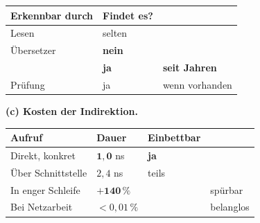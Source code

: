 \begin{aufgabe}
\begin{center}
\end{center}

\begin{center}
\renewcommand{\arraystretch}{1.45}
\begin{tabular}{@{}P{2.8cm}P{2.2cm}P{2.8cm}@{}}
\toprule
\textbf{Erkennbar durch} & \textbf{Findet es?} & \\
\midrule
Lesen & \textcolor{akzent}{selten} & \\
Übersetzer & \textcolor{akzent}{\textbf{nein}} & \\
 & \textcolor{gruen}{\textbf{ja}} & \textbf{seit Jahren}\\
Prüfung & \textcolor{gruen}{ja} & wenn vorhanden\\
\bottomrule
\end{tabular}
\end{center}

\medskip
\textbf{(c) Kosten der Indirektion.}

\begin{center}
\renewcommand{\arraystretch}{1.45}
\begin{tabular}{@{}P{2.8cm}P{2.2cm}P{2.4cm}P{1.8cm}@{}}
\toprule
\textbf{Aufruf} & \textbf{Dauer} & \textbf{Einbettbar} & \\
\midrule
Direkt, konkret & $\mathbf{1{,}0}$ ns & \textcolor{gruen}{\textbf{ja}} & \\
Über Schnittstelle & $2{,}4$ ns & \textcolor{mittel}{teils} & \\
In enger Schleife & \textcolor{akzent}{$\mathbf{+140\,\%}$} & & \textcolor{akzent}{spürbar}\\
Bei Netzarbeit & \textcolor{gruen}{$<0{,}01\,\%$} & & \textcolor{gruen}{belanglos}\\
\bottomrule
\end{tabular}
\end{center}

\begin{center}
\begin{minipage}{0.88\textwidth}
\end{minipage}
\end{center}


\end{aufgabe}
